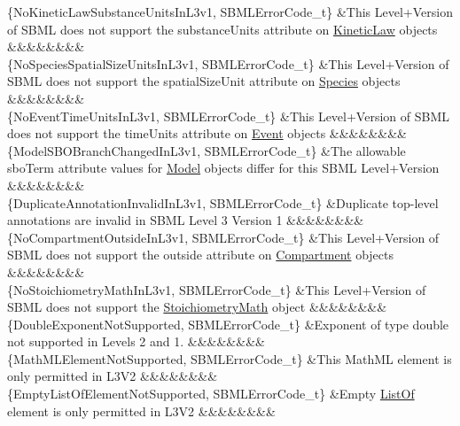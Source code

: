 \begin{DoxyParagraph}{}
\begin{longtabu}
\{No\+Kinetic\+Law\+Substance\+Units\+In\+L3v1, S\+B\+M\+L\+Error\+Code\+\_\+t\} &This Level+\+Version of S\+B\+ML does not support the \textquotesingle{}substance\+Units\textquotesingle{} attribute on \hyperlink{class_kinetic_law}{Kinetic\+Law} objects &&&&&&&&\\
\{No\+Species\+Spatial\+Size\+Units\+In\+L3v1, S\+B\+M\+L\+Error\+Code\+\_\+t\} &This Level+\+Version of S\+B\+ML does not support the \textquotesingle{}spatial\+Size\+Unit\textquotesingle{} attribute on \hyperlink{class_species}{Species} objects &&&&&&&&\\
\{No\+Event\+Time\+Units\+In\+L3v1, S\+B\+M\+L\+Error\+Code\+\_\+t\} &This Level+\+Version of S\+B\+ML does not support the \textquotesingle{}time\+Units\textquotesingle{} attribute on \hyperlink{class_event}{Event} objects &&&&&&&&\\
\{Model\+S\+B\+O\+Branch\+Changed\+In\+L3v1, S\+B\+M\+L\+Error\+Code\+\_\+t\} &The allowable \textquotesingle{}sbo\+Term\textquotesingle{} attribute values for \hyperlink{class_model}{Model} objects differ for this S\+B\+ML Level+\+Version &&&&&&&&\\
\{Duplicate\+Annotation\+Invalid\+In\+L3v1, S\+B\+M\+L\+Error\+Code\+\_\+t\} &Duplicate top-\/level annotations are invalid in S\+B\+ML Level 3 Version 1 &&&&&&&&\\
\{No\+Compartment\+Outside\+In\+L3v1, S\+B\+M\+L\+Error\+Code\+\_\+t\} &This Level+\+Version of S\+B\+ML does not support the \textquotesingle{}outside\textquotesingle{} attribute on \hyperlink{class_compartment}{Compartment} objects &&&&&&&&\\
\{No\+Stoichiometry\+Math\+In\+L3v1, S\+B\+M\+L\+Error\+Code\+\_\+t\} &This Level+\+Version of S\+B\+ML does not support the \hyperlink{class_stoichiometry_math}{Stoichiometry\+Math} object &&&&&&&&\\
\{Double\+Exponent\+Not\+Supported, S\+B\+M\+L\+Error\+Code\+\_\+t\} &Exponent of type double not supported in Levels 2 and 1. &&&&&&&&\\
\{Math\+M\+L\+Element\+Not\+Supported, S\+B\+M\+L\+Error\+Code\+\_\+t\} &This Math\+ML element is only permitted in L3\+V2 &&&&&&&&\\
\{Empty\+List\+Of\+Element\+Not\+Supported, S\+B\+M\+L\+Error\+Code\+\_\+t\} &Empty \textquotesingle{}\hyperlink{class_list_of}{List\+Of}\textquotesingle{} element is only permitted in L3\+V2 &&&&&&&&\\

\end{longtabu}
\end{DoxyParagraph}

